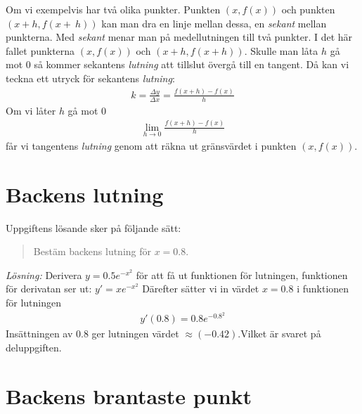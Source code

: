\documentclass[a4paper,12pt]{article}
\begin{document}
Om vi exempelvis har två olika punkter. Punkten $(x, f(x))$ och punkten 
$(x+h, f(x+~h))$ kan man dra en linje mellan dessa, en \emph{sekant}
mellan punkterna. Med \emph{sekant} menar man på medellutningen till 
två punkter. I det här fallet punkterna $(x, f(x))$ och $(x+h, f(x+h))$. 
Skulle man låta $h$  gå mot $0$ så kommer sekantens \emph{lutning} att
tillslut övergå till en tangent. Då kan vi teckna ett utryck för sekantens 
\emph{lutning}:
%
\begin{align*}
  k=\frac{\Delta y}{\Delta x}=\frac{f(x+h)-f(x)}{h}
\end{align*}
%
Om vi låter $h$ gå mot $0$
%
\begin{align*}
  \lim_{h\to 0}\frac{f(x+h)-f(x)}{h}
\end{align*}
%
får vi tangentens \emph{lutning} genom att 
räkna ut gränsvärdet i punkten $(x, f(x))$.


\section{Backens lutning}
\label{sec:uppg1}


Uppgiftens lösande sker på följande sätt:
%
\begin{quote} 
  Bestäm backens lutning för $x = 0.8$.
\end{quote}
%
\emph{Lösning:} Derivera $y=0.5e^{-x^2}$ för att få ut funktionen för 
lutningen, funktionen för derivatan ser ut: $y'=xe^{-x^2}$
Därefter sätter vi in värdet $x=0.8$ i funktionen för lutningen
%
\begin{align*}
  y'(0.8)=0.8e^{-0.8^2}
\end{align*}
%
Insättningen av $0.8$ ger lutningen värdet $\approx(-0.42)$.Vilket är svaret
på deluppgiften. 
%


\section{Backens brantaste punkt}
\label{sec:uppg2}
\end{document}
